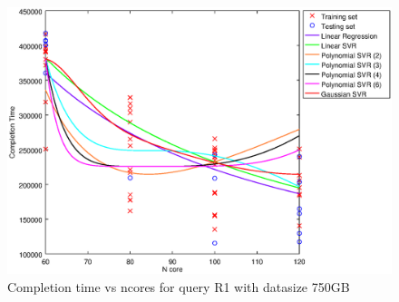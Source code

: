 
\begin {figure}[hbtp]
\centering
\includegraphics[width=\textwidth]{output/R1_750_ONLY_1_OVER_NCORES/plot_R1_750.eps}
\caption{Completion time vs ncores for query R1 with datasize 750GB}
\label{fig:all_nonlinear_R1_750}
\end {figure}
